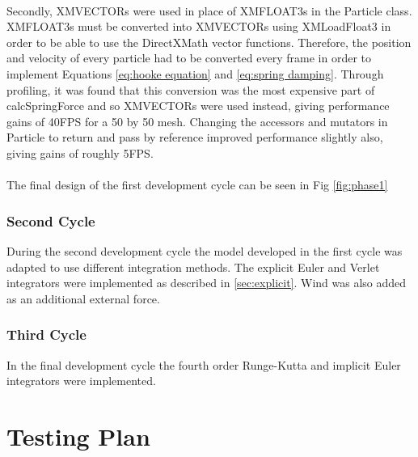 \\Secondly, XMVECTORs were used in place of XMFLOAT3s in the Particle class. XMFLOAT3s must be converted into XMVECTORs using XMLoadFloat3 in order to be able to use the DirectXMath vector functions. Therefore, the position and velocity of every particle had to be converted every frame in order to implement Equations \ref{eq:hooke equation} and \ref{eq:spring damping}. Through profiling, it was found that this conversion was the most expensive part of calcSpringForce and so XMVECTORs were used instead, giving performance gains of 40FPS for a 50 by 50 mesh. Changing the accessors and mutators in Particle to return and pass by reference improved performance slightly also, giving gains of roughly 5FPS.
\\\\The final design of the first development cycle can be seen in Fig \ref{fig:phase1}

\subsubsection{Second Cycle}
During the second development cycle the model developed in the first cycle was adapted to use different integration methods. The explicit Euler and Verlet integrators were implemented as described in \ref{sec:explicit}. Wind was also added as an additional external force.

\subsubsection{Third Cycle}
In the final development cycle the fourth order Runge-Kutta and implicit Euler integrators were implemented.

\section{Testing Plan}

